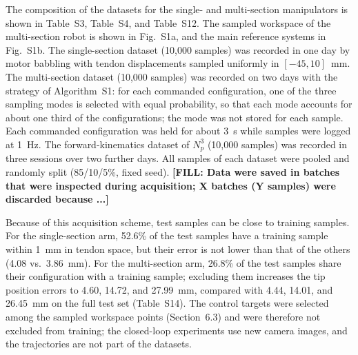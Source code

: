 The composition of the datasets for the single- and multi-section manipulators is shown in Table~S3, Table~S4, and Table~S12. The sampled workspace of the multi-section robot is shown in Fig.~S1a, and the main reference systems in Fig.~S1b. The single-section dataset (10,000 samples) was recorded in one day by motor babbling with tendon displacements sampled uniformly in $[-45, 10]$~mm. The multi-section dataset (10,000 samples) was recorded on two days with the strategy of Algorithm~S1: for each commanded configuration, one of the three sampling modes is selected with equal probability, so that each mode accounts for about one third of the configurations; the mode was not stored for each sample. Each commanded configuration was held for about 3~s while samples were logged at 1~Hz. The forward-kinematics dataset of $N_p^3$ (10,000 samples) was recorded in three sessions over two further days. All samples of each dataset were pooled and randomly split (85/10/5\%, fixed seed). \textbf{[FILL: Data were saved in batches that were inspected during acquisition; X batches (Y samples) were discarded because ...]}

Because of this acquisition scheme, test samples can be close to training samples. For the single-section arm, 52.6\% of the test samples have a training sample within 1~mm in tendon space, but their error is not lower than that of the others (4.08 vs.\ 3.86~mm). For the multi-section arm, 26.8\% of the test samples share their configuration with a training sample; excluding them increases the tip position errors to 4.60, 14.72, and 27.99~mm, compared with 4.44, 14.01, and 26.45~mm on the full test set (Table~S14). The control targets were selected among the sampled workspace points (Section~6.3) and were therefore not excluded from training; the closed-loop experiments use new camera images, and the trajectories are not part of the datasets.
